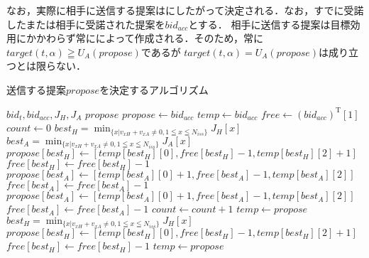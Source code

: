 なお，実際に相手に送信する提案はにしたがって決定される．なお，すでに受諾したまたは相手に受諾された提案を$bid_{acc}$とする．
相手に送信する提案は目標効用にかかわらず常にによって作成される．そのため，常に$target(t,\alpha) \geqq U_A(propose)$であるが
$target(t,\alpha) = U_A(propose)$は成り立つとは限らない．
\begin{algorithm}
    \caption{送信する提案$propose$を決定するアルゴリズム}\label{alg:bidding}
    \begin{algorithmic}[1]
        \renewcommand{\algorithmicrequire}{\textbf{Input:}}
        \renewcommand{\algorithmicensure}{\textbf{Output:}}
        \REQUIRE $bid_t,bid_{acc}, J_H, J_A$
        \ENSURE  $propose$
        \STATE $propose \leftarrow bid_{acc}$
        \STATE $temp \leftarrow bid_{acc}$
        \STATE $\mathit{free} \leftarrow (bid_{acc})^{\mathrm{T}}[1]$
        \STATE $count \leftarrow 0$
            \STATE $best_H = \displaystyle \min_{\{x | v_{xH} + v_{xA} \neq 0, 1 \leqq x \leqq N_{iss} \} } J_H[x]$ 
            \STATE $best_A = \displaystyle \min_{\{x | v_{xH} + v_{xA} \neq 0, 1 \leqq x \leqq N_{iss} \} } J_A[x]$ 
                \STATE $propose[best_H] \leftarrow [temp[best_H][0], \mathit{free}[best_H] - 1, temp[best_H][2] + 1]$
                \STATE $\mathit{free}[best_H] \leftarrow \mathit{free}[best_H] - 1$
                \STATE $propose[best_A] \leftarrow [temp[best_A][0] + 1, \mathit{free}[best_A] - 1, temp[best_A][2]]$
                \STATE $\mathit{free}[best_A] \leftarrow \mathit{free}[best_A] - 1$
            \ELSE
                \STATE $propose[best_A] \leftarrow [temp[best_A][0] + 1, \mathit{free}[best_A] - 1, temp[best_A][2]]$
                \STATE $\mathit{free}[best_A] \leftarrow \mathit{free}[best_A] - 1$
            \ENDIF
            \STATE $count \leftarrow count + 1$
            \STATE $temp \leftarrow propose$
        \ENDWHILE
            \STATE $best_H = \displaystyle \min_{\{x | v_{xH} + v_{xA} \neq 0, 1 \leqq x \leqq N_{iss} \} } J_H[x]$ 
            \STATE $propose[best_H] \leftarrow [temp[best_H][0], \mathit{free}[best_H] - 1, temp[best_H][2] + 1]$
            \STATE $\mathit{free}[best_H] \leftarrow \mathit{free}[best_H] - 1$
            \STATE $temp \leftarrow propose$
        \ENDWHILE
    \end{algorithmic}
\end{algorithm}

